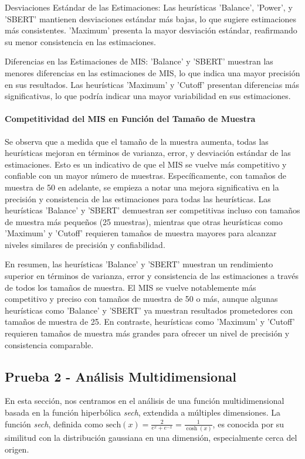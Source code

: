 \documentclass{article}
\begin{document}
Desviaciones Estándar de las Estimaciones: Las heurísticas 'Balance', 'Power', y 'SBERT' mantienen desviaciones estándar más bajas, lo que sugiere estimaciones más consistentes.
'Maximum' presenta la mayor desviación estándar, reafirmando su menor consistencia en las estimaciones.

Diferencias en las Estimaciones de MIS: 'Balance' y 'SBERT' muestran las menores diferencias en las estimaciones de MIS, lo que indica una mayor precisión en sus resultados.
Las heurísticas 'Maximum' y 'Cutoff' presentan diferencias más significativas, lo que podría indicar una mayor variabilidad en sus estimaciones.

\paragraph{Competitividad del MIS en Función del Tamaño de Muestra}
Se observa que a medida que el tamaño de la muestra aumenta, todas las heurísticas mejoran en términos de varianza, error, y desviación estándar de las estimaciones. Esto es un indicativo de que el MIS se vuelve más competitivo y confiable con un mayor número de muestras.
Específicamente, con tamaños de muestra de 50 en adelante, se empieza a notar una mejora significativa en la precisión y consistencia de las estimaciones para todas las heurísticas.
Las heurísticas 'Balance' y 'SBERT' demuestran ser competitivas incluso con tamaños de muestra más pequeños (25 muestras), mientras que otras heurísticas como 'Maximum' y 'Cutoff' requieren tamaños de muestra mayores para alcanzar niveles similares de precisión y confiabilidad.

En resumen, las heurísticas 'Balance' y 'SBERT' muestran un rendimiento superior en términos de varianza, error y consistencia de las estimaciones a través de todos los tamaños de muestra. El MIS se vuelve notablemente más competitivo y preciso con tamaños de muestra de 50 o más, aunque algunas heurísticas como 'Balance' y 'SBERT' ya muestran resultados prometedores con tamaños de muestra de 25. En contraste, heurísticas como 'Maximum' y 'Cutoff' requieren tamaños de muestra más grandes para ofrecer un nivel de precisión y consistencia comparable.

\subsection{Prueba 2 - Análisis Multidimensional}

En esta sección, nos centramos en el análisis de una función multidimensional basada en la función hiperbólica \textit{sech}, extendida a múltiples dimensiones. La función \textit{sech}, definida como \( \text{sech}(x) = \frac{2}{e^x + e^{-x}} = \frac{1}{\cosh(x)} \), es conocida por su similitud con la distribución gaussiana en una dimensión, especialmente cerca del origen.
\end{document}
